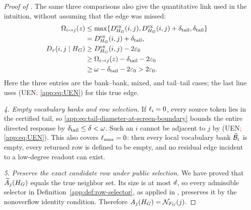 \begin{proof}[Proof of \AppLowDegreeScreenRef]
The same three comparisons also give the quantitative link used in the
intuition, without assuming that the edge was missed:
\begin{align*}
 \Omega_{i\to j}(z)
 &\le\max\{D^{\mathrm{ex}}_{H_{G}}(i,j),
           D^{\mathrm{ex}}_{H_{G}}(i,j)+\delta_{\mathrm{tail}},
           \delta_{\mathrm{tail}}\}\\
 &=D^{\mathrm{ex}}_{H_{G}}(i,j)+\delta_{\mathrm{tail}},\\
 D_{\tau}(i,j\mid H_{G})
 &\ge D^{\mathrm{ex}}_{H_{G}}(i,j)-2\varepsilon_0\\
 &\ge\Omega_{i\to j}(z)-\delta_{\mathrm{tail}}-2\varepsilon_0\\
 &\ge\omega-\delta_{\mathrm{tail}}-2\varepsilon_0>2\varepsilon_0.
\end{align*}
Here the three entries are the bank--bank, mixed, and tail--tail cases;
the last line uses (UEN\textcolor{red}{; \cref{app:eq:UEN}}) for this true edge.

\emph{4. Empty vocabulary banks and row selection.}
If $\ell_{i}=0$, every source token lies in the certified tail, so
\eqref{app:eq:tail-diameter-at-screen-boundary} bounds the entire directed
response by
$\delta_{\mathrm{tail}}\le\delta<\omega$.  Such an $i$ cannot be
adjacent to $j$ by (UEN\textcolor{red}{; \cref{app:eq:UEN}}).  This also covers $\ell_{\max}=0$: then every local
vocabulary bank $\widehat{\mathcal B}_{i}$ is empty, every returned row is defined to
be empty, and no residual edge
incident to a low-degree readout can exist.


\emph{5. Preserve the exact candidate row under public selection.}
We have proved that $\widetilde A_{j}(H_{G})$ equals the true neighbor set.  Its size
is at most $d$, so every admissible selector in
Definition~\ref{app:def:row-selector}, as applied in ,
preserves it by the nonoverflow identity condition.  Therefore
$A_{j}(H_{G})=\mathcal N_{F_{G}}(j)$.
\end{proof}
